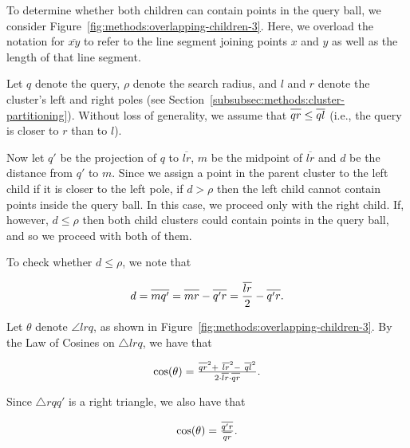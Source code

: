 To determine whether both children can contain points in the query ball, we consider Figure~\ref{fig:methods:overlapping-children-3}.
Here, we overload the notation for $\overline{x y}$ to refer to the line segment joining points $x$ and $y$ as well as the length of that line segment.

Let $q$ denote the query, $\rho$ denote the search radius, and $l$ and $r$ denote the cluster's left and right poles (see Section~\ref{subsubsec:methods:cluster-partitioning}).
Without loss of generality, we assume that $\overline{q r \vphantom{l}} \leq \overline{q l}$ (i.e., the query is closer to $r$ than to $l$).

Now let $q'$ be the projection of $q$ to $\overline{l r}$, $m$ be the midpoint of $\overline{l r}$ and $d$ be the distance from $q'$ to $m$.
Since we assign a point in the parent cluster to the left child if it is closer to the left pole, if $d > \rho$ then the left child cannot contain points inside the query ball.
In this case, we proceed only with the right child.
If, however, $d \leq \rho$ then both child clusters could contain points in the query ball, and so we proceed with both of them.

To check whether $d \leq \rho$, we note that

\begin{equation}
    d = \overline{m q' \vphantom{l}} = \overline{m r \vphantom{l}} - \overline{q' r \vphantom{l}} = \frac{\overline{l r}}{2} - \overline{q' r \vphantom{l}}.
    \label{eq:methods:d-expression}
\end{equation}

Let $\theta$ denote $\angle l r q$, as shown in Figure~\ref{fig:methods:overlapping-children-3}.
By the Law of Cosines on $\triangle l r q$, we have that

\begin{equation}
    \text{cos}(\theta) = \tfrac{\overline{q r \vphantom{l}}^2 + \ \overline{l r}^2 - \ \overline{q l}^2}{2 \cdot \overline{l r} \cdot \overline{q r \vphantom{l}}}.
    \label{eq:methods:cosine-law}
\end{equation}

Since $\triangle r q q'$ is a right triangle, we also have that

\begin{equation}
    \text{cos}(\theta) = \tfrac{\overline{q' r \vphantom{l}}}{\overline{q r \vphantom{l}}}.
    \label{eq:methods:cosine-law-right-triangle}
\end{equation}

